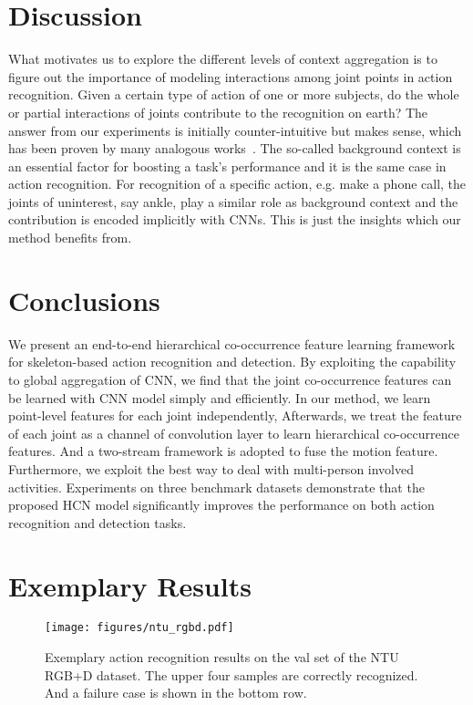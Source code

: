 \documentclass{article}
\begin{document}
\section{Discussion}
What motivates us to explore the different levels of context aggregation is to figure out the importance of modeling interactions among joint points in action recognition. Given a certain type of action of one or more subjects, do the whole or partial interactions of joints contribute to the recognition on earth? The answer from our experiments is initially counter-intuitive but makes sense, which has been proven by many analogous works~\cite{he2016deep,zhong2017cascade}. The so-called background context is an essential factor for boosting a task's performance and it is the same case in action recognition. For recognition of a specific action, e.g. make a phone call, the joints of uninterest, say ankle, play a similar role as background context and the contribution is encoded implicitly with CNNs. This is just the insights which our method benefits from.

\section{Conclusions}
We present an end-to-end hierarchical co-occurrence feature learning framework for skeleton-based action recognition and detection. By exploiting the capability to global aggregation of CNN, we find that the joint co-occurrence features can be learned with CNN model simply and efficiently. In our method, we learn point-level features for each joint independently, Afterwards, we treat the  feature of each joint as a channel of convolution layer to learn hierarchical co-occurrence features. And a two-stream framework is adopted to fuse the motion feature. Furthermore, we exploit the best way to deal with multi-person involved activities. Experiments on three benchmark datasets demonstrate that the proposed HCN model significantly improves the performance on both action recognition and detection tasks.




\newpage
\onecolumn
\appendix

\section{Exemplary Results}

\begin{figure*}[h!]
  \centering
  \texttt{[image: figures/ntu\_rgbd.pdf]}
  \caption{Exemplary action recognition results on the val set of the NTU RGB+D dataset. The upper four samples are correctly recognized. And a failure case is shown in the bottom row.}
  \label{fig:cls_examples}
\end{figure*}
\end{document}
